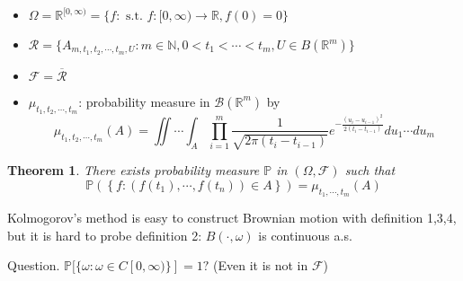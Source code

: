 \documentclass[12pt]{report}
\newcommand{\R}{\mathbb{R}}
\renewcommand{\P}{\mathbb{P}}
\newcommand{\F}{\mathcal{F}}
\renewcommand{\1}{\mathbb{1}}
\renewcommand{\O}{\Omega}
\theoremstyle{break}
\newtheorem{thm}{Theorem}[section] %
\theoremstyle{newdef}
\theoremstyle{remark}
\begin{document}
\begin{itemize}
\item $\O = \R^{[0,\infty)} = \{ f : \text{ s.t. } f : [0,\infty) \rightarrow \R, f(0) = 0\}$
\item $\mathcal{R} = \{ A_{m, t_1, t_2, \cdots, t_m, U} : m \in \mathbb{N}, 0 < t_1 < \cdots < t_m, U \in B(\R^m)\}$
\item $\F = \overline{\mathcal{R}}$
\item $\mu_{t_1,t_2,\cdots,t_m}$: probability measure in $\mathcal{B}(\R^m)$ by
$$\mu_{t_1,t_2,\cdots,t_m}(A) = \iint \cdots \int_A \prod_{i=1}^{m} \frac{1}{\sqrt{2\pi(t_i-t_{i-1})}} e^{-\frac{(u_i-u_{i-1})^2}{2(t_i-t_{i-1})}} du_1\cdots du_m$$
\end{itemize}

\begin{thm}
There exists probability measure $\P$ in $(\O,\F)$ such that
$$ \P \left(\left\{ f : (f(t_1), \cdots, f(t_n)) \in A \right\}\right) = \mu_{t_1,\cdots,t_m}(A)$$
\end{thm}

Kolmogorov's method is easy to construct Brownian motion with definition 1,3,4, but it is hard to probe definition 2: $B(\cdot,\omega)$ is continuous a.s.

Question. $\P[\{\omega : \omega \in C[0,\infty)\}] = 1?$ (Even it is not in $\F$)

\end{document}
